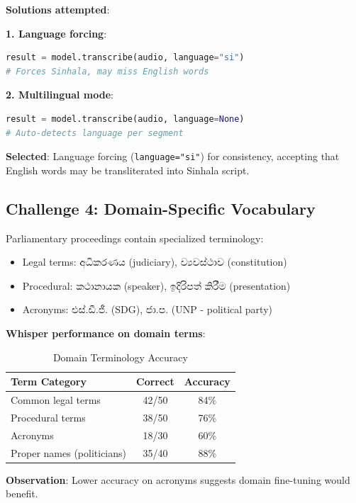 \documentclass[11pt,a4paper]{article}
\begin{document}
\textbf{Solutions attempted}:

\textbf{1. Language forcing}:
\begin{lstlisting}[language=Python]
result = model.transcribe(audio, language="si")
# Forces Sinhala, may miss English words
\end{lstlisting}

\textbf{2. Multilingual mode}:
\begin{lstlisting}[language=Python]
result = model.transcribe(audio, language=None)
# Auto-detects language per segment
\end{lstlisting}

\textbf{Selected}: Language forcing (\texttt{language="si"}) for consistency, accepting that English words may be transliterated into Sinhala script.

\subsection{Challenge 4: Domain-Specific Vocabulary}

Parliamentary proceedings contain specialized terminology:

\begin{itemize}
    \item Legal terms: අධිකරණය (judiciary), ව්‍යවස්ථාව (constitution)
    \item Procedural: කථානායක (speaker), ඉදිරිපත් කිරීම (presentation)
    \item Acronyms: එස්.ඩී.ජී. (SDG), ජා.ප. (UNP - political party)
\end{itemize}

\textbf{Whisper performance on domain terms}:

\begin{table}[htbp]
\centering
\caption{Domain Terminology Accuracy}
\begin{tabular}{@{}lcc@{}}
\toprule
\textbf{Term Category} & \textbf{Correct} & \textbf{Accuracy} \\ \midrule
Common legal terms & 42/50 & 84\% \\
Procedural terms & 38/50 & 76\% \\
Acronyms & 18/30 & 60\% \\
Proper names (politicians) & 35/40 & 88\% \\
\bottomrule
\end{tabular}
\end{table}

\textbf{Observation}: Lower accuracy on acronyms suggests domain fine-tuning would benefit.
\end{document}
